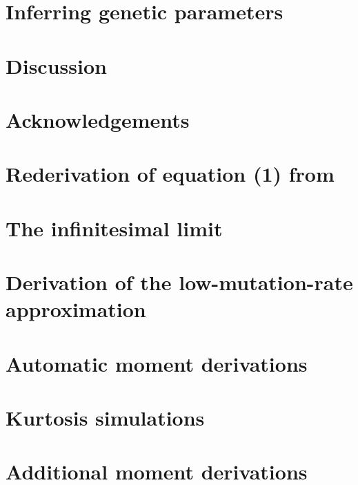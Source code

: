 \documentclass{article}
\newcommand{\beginsupplement}{%
        \setcounter{table}{0}
        \renewcommand{\thetable}{S\arabic{table}}%
        \setcounter{figure}{0}
        \renewcommand{\thefigure}{S\arabic{figure}}%
     }
\begin{document}
\section*{Inferring genetic parameters}

\section*{Discussion}

\section*{Acknowledgements}

 

\clearpage

\appendix
\beginsupplement

\section{Rederivation of equation (1) from \citet{Schraiber2015}}
\label{slrederive}

\section{The infinitesimal limit}
\label{clt}

\section{Derivation of the low-mutation-rate approximation}
\label{lmr_der}

\section{Automatic moment derivations}
\label{symmath}

\section{Kurtosis simulations}
\label{kurtsim}

\section{Additional moment derivations}
\label{moments}

\end{document}
